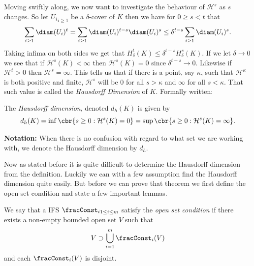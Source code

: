 Moving swiftly along, we now want to investigate the behaviour of $\mathcal{H}^{s}$ as $s$ changes. So let ${U_i}_{i \geq 1}$ be a $\delta$-cover of $K$ then we have for $0 \geq s < t$ that
\begin{equation}
	\sum_{i \geq 1} \diam(U_i)^{t} = \sum_{i \geq 1} \diam(U_i)^{t-s}\diam(U_i)^{s} \leq \delta^{t-s}\sum_{i \geq 1}\diam(U_i)^{s}.
\end{equation}
Taking infima on both sides we get that $H^t_{\delta}(K) \leq \delta^{t-s}H^s_{\delta}(K)$. If we let $\delta \to 0$ we see that if $\mathcal{H}^{s}(K) < \infty$ then $\mathcal{H}^{s}(K) = 0$ since $\delta^{t-s} \to 0$. Likewise if $\mathcal{H}^{t} > 0$ then $\mathcal{H}^{s} = \infty$. 
This tells us that if there is a point, say $\kappa$, such that $\mathcal{H}^{\kappa}$ is both positive and finite, $\mathcal{H}^{s}$ will be 0 for all $s > \kappa$ and $\infty$ for all $s < \kappa$. That such value is called the \emph{Hausdorff Dimension} of $K$. Formally written:
\begin{defi}\label{hausdorffDimDefi}
	The \emph{Hausdorff dimension}, denoted $d_h(K)$ is given by
	\begin{equation}
		d_h(K) = \inf\cbr{s \geq 0 : \mathcal{H}^{s}(K) = 0} = \sup\cbr{s \geq 0 : \mathcal{H}^{s}(K) = \infty}.
	\end{equation}
\end{defi} 
\textbf{Notation:} When there is no confusion with regard to what set we are working with, we denote the Hausdorff dimension by $d_h$.

Now as stated before it is quite difficult to determine the Hausdorff dimension from the definition. Luckily we can with a few assumption find the Hausdorff dimension quite easily. But before we can prove that theorem we first define the open set condition and state a few important lemmas.

\begin{defi}\label{OpenSetCondition}
	We say that a IFS ${\fracConst_i}_{1 \leq i \leq m}$ satisfy the \emph{open set condition} if there exists a non-empty bounded open set $V$ such that
	\begin{equation}
		V \supset \bigcup_{i = 1}^{m} \fracConst_i(V)
	\end{equation}
	and each $\fracConst_{i}(V)$ is disjoint.
\end{defi}

